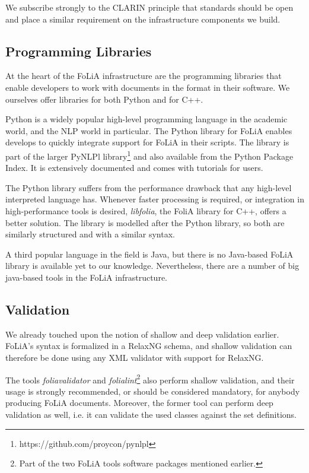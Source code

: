 \documentclass[a4paper,10pt,twoside]{article}
\begin{document}
We subscribe strongly to the CLARIN principle that standards should be open and
place a similar requirement on the infrastructure components we build. 

\subsection{Programming Libraries}

At the heart of the FoLiA infrastructure are the programming libraries that
enable developers to work with documents in the format in their software. We
ourselves offer libraries for both Python and for C++.

Python is a widely popular high-level programming language in the academic
world, and the NLP world in particular.  The Python library for FoLiA enables
develops to quickly integrate support for FoLiA in their scripts. The library
is part of the larger PyNLPl
library\footnote{https://github.com/proycon/pynlpl} and also available from the
Python Package Index. It is extensively documented and comes with tutorials for
users.

The Python library suffers from the performance drawback that any high-level
interpreted language has. Whenever faster processing is required, or
integration in high-performance tools is desired, \emph{libfolia}, the FoliA
library for C++, offers a better solution. The library is modelled after the
Python library, so both are similarly structured and with a similar syntax.

A third popular language in the field is Java, but there is no Java-based FoLiA
library is available yet to our knowledge. Nevertheless, there are a number of
big java-based tools in the FoLiA infrastructure.

\subsection{Validation}

We already touched upon the notion of shallow and deep validation earlier.
FoLiA's syntax is formalized in a RelaxNG schema, and shallow validation can
therefore be done using any XML validator with support for RelaxNG. 

The tools \emph{foliavalidator} and \emph{folialint}\footnote{Part of the two
FoLiA tools software packages mentioned earlier.} also perform shallow
validation, and their usage is strongly recommended, or should be considered
mandatory, for anybody producing FoLiA documents. Moreover, the former tool can
perform deep validation as well, i.e. it can validate the used classes against
the set definitions.
\end{document}
